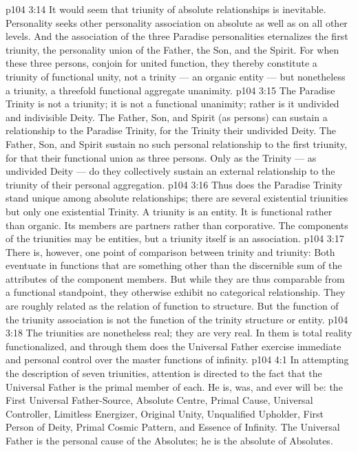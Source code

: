 \vs p104 3:14 \pc It would seem that triunity of absolute relationships is inevitable. Personality seeks other personality association on absolute as well as on all other levels. And the association of the three Paradise personalities eternalizes the first triunity, the personality union of the Father, the Son, and the Spirit. For when these three persons,  conjoin for united function, they thereby constitute a triunity of functional unity, not a trinity --- an organic entity --- but nonetheless a triunity, a threefold functional aggregate unanimity.
\vs p104 3:15 The Paradise Trinity is not a triunity; it is not a functional unanimity; rather is it undivided and indivisible Deity. The Father, Son, and Spirit (as persons) can sustain a relationship to the Paradise Trinity, for the Trinity  their undivided Deity. The Father, Son, and Spirit sustain no such personal relationship to the first triunity, for that  their functional union as three persons. Only as the Trinity --- as undivided Deity --- do they collectively sustain an external relationship to the triunity of their personal aggregation.
\vs p104 3:16 Thus does the Paradise Trinity stand unique among absolute relationships; there are several existential triunities but only one existential Trinity. A triunity is  an entity. It is functional rather than organic. Its members are partners rather than corporative. The components of the triunities may be entities, but a triunity itself is an association.
\vs p104 3:17 There is, however, one point of comparison between trinity and triunity: Both eventuate in functions that are something other than the discernible sum of the attributes of the component members. But while they are thus comparable from a functional standpoint, they otherwise exhibit no categorical relationship. They are roughly related as the relation of function to structure. But the function of the triunity association is not the function of the trinity structure or entity.
\vs p104 3:18 The triunities are nonetheless real; they are very real. In them is total reality functionalized, and through them does the Universal Father exercise immediate and personal control over the master functions of infinity.
\vs p104 4:1 In attempting the description of seven triunities, attention is directed to the fact that the Universal Father is the primal member of each. He is, was, and ever will be: the First Universal Father\hyp{}Source, Absolute Centre, Primal Cause, Universal Controller, Limitless Energizer, Original Unity, Unqualified Upholder, First Person of Deity, Primal Cosmic Pattern, and Essence of Infinity. The Universal Father is the personal cause of the Absolutes; he is the absolute of Absolutes.
